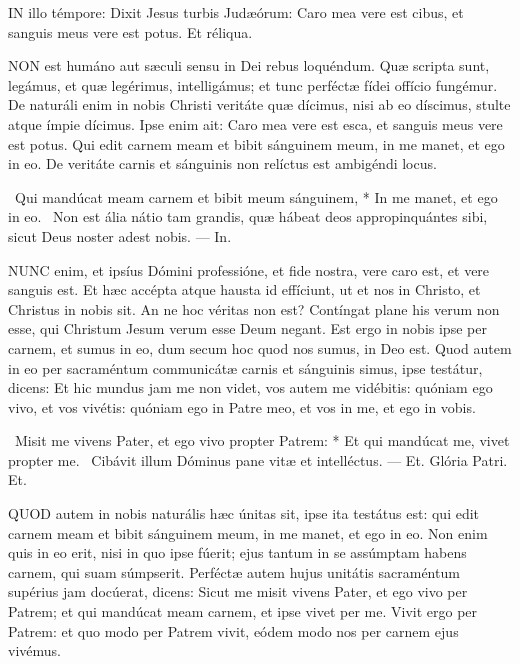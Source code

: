 
\lettrine[lines=2]{I}{N} illo témpore: Dixit Jesus turbis Judæórum: Caro mea vere est cibus, et sanguis meus vere est potus. Et réliqua.



\lettrine[lines=2]{N}{ON} est humáno aut sæculi sensu in Dei rebus loquéndum. Quæ scripta sunt, legámus, et quæ legérimus, intelligámus; et tunc perféctæ fídei offício fungémur. De naturáli enim in nobis Christi veritáte quæ dícimus, nisi ab eo díscimus, stulte atque ímpie dícimus. Ipse enim ait: Caro mea vere est esca, et sanguis meus vere est potus. Qui edit carnem meam et bibit sánguinem meum, in me manet, et ego in eo. De veritáte carnis et sánguinis non relíctus est ambigéndi locus.

\R\ Qui mandúcat meam carnem et bibit meum sánguinem, * In me manet, et ego in eo. \V\ Non est ália nátio tam grandis, quæ hábeat deos appropinquántes sibi, sicut Deus noster adest nobis. --- In.


\lettrine[lines=2]{N}{UNC} enim, et ipsíus Dómini professióne, et fide nostra, vere caro est, et vere sanguis est. Et hæc accépta atque hausta id effíciunt, ut et nos in Christo, et Christus in nobis sit. An ne hoc véritas non est? Contíngat plane his verum non esse, qui Christum Jesum verum esse Deum negant. Est ergo in nobis ipse per carnem, et sumus in eo, dum secum hoc quod nos sumus, in Deo est. Quod autem in eo per sacraméntum communicátæ carnis et sánguinis simus, ipse testátur, dicens: Et hic mundus jam me non videt, vos autem me vidébitis: quóniam ego vivo, et vos vivétis: quóniam ego in Patre meo, et vos in me, et ego in vobis.

\R\ Misit me vivens Pater, et ego vivo propter Patrem: * Et qui mandúcat me, vivet propter me. \V\ Cibávit illum Dóminus pane vitæ et intelléctus. --- Et. Glória Patri. Et.


\lettrine[lines=2]{Q}{UOD} autem in nobis naturális hæc únitas sit, ipse ita testátus est: qui edit carnem meam et bibit sánguinem meum, in me manet, et ego in eo. Non enim quis in eo erit, nisi in quo ipse fúerit; ejus tantum in se assúmptam habens carnem, qui suam súmpserit. Perféctæ autem hujus unitátis sacraméntum supérius jam docúerat, dicens: Sicut me misit vivens Pater, et ego vivo per Patrem; et qui mandúcat meam carnem, et ipse vivet per me. Vivit ergo per Patrem: et quo modo per Patrem vivit, eódem modo nos per carnem ejus vivémus.

